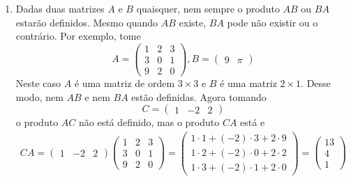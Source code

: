 \begin{observacoes}
    \begin{enumerate}
        \item Dadas duas matrizes $A$ e $B$ quaisquer, nem sempre o produto $AB$ ou $BA$ estarão definidos. Mesmo quando $AB$ existe, $BA$
            pode não existir ou o contrário. Por exemplo, tome
            \[
                A = \begin{pmatrix}
                    1 & 2 & 3\\
                    3 & 0 & 1\\
                    9 & 2 & 0
                \end{pmatrix},
                B = \begin{pmatrix}
                    9 & \pi
                \end{pmatrix}
            \]
            Neste caso $A$ é uma matriz de ordem $3\times 3$ e $B$ é uma matriz $2 \times 1$. Desse modo, nem $AB$ e nem $BA$ estão
            definidas.
            Agora tomando
            \[
                C = \begin{pmatrix}
                    1 & -2 & 2
                \end{pmatrix}
            \]
            o produto $AC$ não está definido, mas o produto $CA$ está e
            \begin{align*}
                CA = \begin{pmatrix}
                    1 & -2 & 2
                \end{pmatrix}
                \begin{pmatrix}
                    1 & 2 & 3\\
                    3 & 0 & 1\\
                    9 & 2 & 0
                    \end{pmatrix} = \begin{pmatrix}
                    1\cdot 1 + (-2)\cdot 3 + 2\cdot 9\\
                    1\cdot 2 + (-2)\cdot 0 + 2\cdot 2\\
                    1\cdot 3 + (-2)\cdot 1 + 2\cdot 0
                \end{pmatrix}
                = \begin{pmatrix}
                    13\\
                    4\\
                    1
                \end{pmatrix}
            \end{align*}


\end{enumerate}
\end{observacoes}
